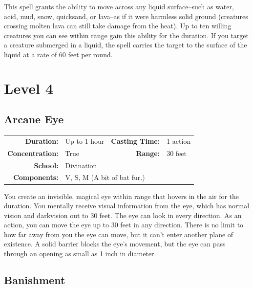 \documentclass[12pt,showtrims]{memoir}
\begin{document}
\vspace{1\baselineskip}\noindent This spell grants the ability to move across any liquid surface--such as water, acid, mud, snow, quicksand, or lava--as if it were harmless solid ground (creatures crossing molten lava can still take damage from the heat). Up to ten willing creatures you can see within range gain this ability for the duration. If you target a creature submerged in a liquid, the spell carries the target to the surface of the liquid at a rate of 60 feet per round.

\newpage
\chapter*{Level 4} 
\section*{Arcane Eye}

{
\small\centering\vspace{-6pt}
\begin{tabular}{rlrl}
\toprule

\textbf{Duration:} & Up to 1 hour &
\textbf{Casting Time:} & 1 action \\
\textbf{Concentration:} & True &
\textbf{Range:} & 30 feet \\
\textbf{School:} & Divination \\
\textbf{Components:} & \multicolumn{3}{p{0.7\textwidth}}{V, S, M (A bit of bat fur.)}\\

\bottomrule
\end{tabular}
}

\vspace{1\baselineskip}\noindent You create an invisible, magical eye within range that hovers in the air for the duration. You mentally receive visual information from the eye, which has normal vision and darkvision out to 30 feet. The eye can look in every direction. As an action, you can move the eye up to 30 feet in any direction. There is no limit to how far away from you the eye can move, but it can't enter another plane of existence. A solid barrier blocks the eye's movement, but the eye can pass through an opening as small as 1 inch in diameter.

\newpage
\section*{Banishment}
\end{document}
